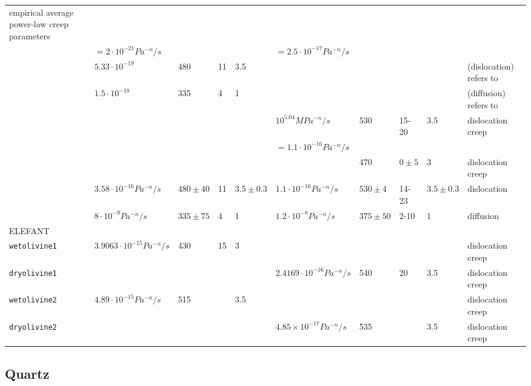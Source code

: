 \begin{tabular}{|l|llll|llll|p{4cm}|}
empirical average power-law creep parameters\\
              & $=2\cdot10^{-21}Pa^{-n}/s$   &&&& $=2.5\cdot 10^{-17}Pa^{-n}/s$  &&&&\\
\cite{tebu12} & $5.33\cdot10^{-19}$ &  480 & 11 & 3.5 &&&&& (dislocation) refers to \cite{hiko03}\\
\cite{tebu12} & $1.5\cdot10^{-18}$ &  335 & 4 & 1 &&&&& (diffusion) refers to \cite{hiko03}\\
\hline
\cite{kako09} & &&&& $10^{5.04}MPa^{-n}/s$ & 530 & 15-20 & 3.5 & dislocation creep\\
              & &&&& $=1.1\cdot10^{-16}Pa^{-n}/s$ &&&&  \\
\cite{liwr06} & &&&&  & 470 & $0\pm5$  & 3  & dislocation creep\\
\hline
\cite{hiko03} & $3.58\cdot10^{-16}Pa^{-n}/s$& $480\pm40$& 11& $3.5\pm 0.3$& $1.1\cdot10^{-16}Pa^{-n}/s$ & $530\pm4$& 14-23 & $3.5\pm0.3$& dislocation\\
\cite{hiko03} & $8\cdot10^{-9}Pa^{-n}/s$& $335\pm75$& 4 &1  & $1.2\cdot 10^{-8}Pa^{-n}/s$& $375\pm50$ & 2-10& 1 & diffusion \\ 
\hline\hline
ELEFANT & &&&&&&&&\\
{\tt wetolivine1} & $3.9063\cdot10^{-15}Pa^{-n}/s$& 430 & 15 & 3 &&&&& dislocation creep \cite{kawu93}\\ 
{\tt dryolivine1} & &&& &$2.4169\cdot10^{-16}Pa^{-n}/s$ & 540 & 20 & 3.5 & dislocation creep \cite{kawu93}\\
{\tt wetolivine2} & $4.89\cdot10^{-15}Pa^{-n}/s$ & 515 & & 3.5  & &&&& dislocation creep \cite{hiko96}\\ 
{\tt dryolivine2} & &&& & $4.85\times10^{-17}Pa^{-n}/s$ & 535 & & 3.5 & dislocation creep \cite{hiko96}\\ 
\hline
\end{tabular}

\newpage
\subsection{Quartz}

